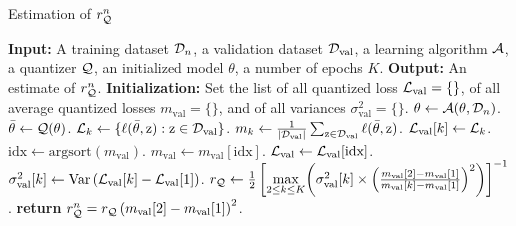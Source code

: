 
\begin{algorithm}
    \caption{Estimation of $r_{{\mathcal{Q}}}^n$}
    \label{algo:main}
    \begin{algorithmic}[1]
        \STATE \textbf{Input:} A training dataset ${\mathcal{D}}_n$, a validation dataset ${\mathcal{D}}_{\textrm{val}}$, a learning algorithm ${\mathcal{A}}$, a quantizer ${\mathcal{Q}}$, an initialized model $\theta$, a number of epochs $K$.
        \STATE \textbf{Output:} An estimate of $r_{{\mathcal{Q}}}^n$.
        \STATE \textbf{Initialization:} Set the list of all quantized loss $\mathcal{L}_{\textrm{val}} = \{\}$, of all average quantized losses $m_{\textrm{val}} = \{\}$, and of all variances $\sigma_{\textrm{val}}^2 = \{\}$.
            \STATE $\theta \leftarrow {\mathcal{A}}(\theta, {\mathcal{D}}_n)$.
            \STATE ${\Bar{\theta}} \leftarrow {\mathcal{Q}}(\theta)$.
            \STATE $\mathcal{L}_k \leftarrow \{\ell({\Bar{\theta}}, {\textnormal{z}}) : {\textnormal{z}}\in{\mathcal{D}}_{\textrm{val}}\}$.
            \STATE $m_k \leftarrow \frac{1}{|{\mathcal{D}}_{\textrm{val}}|}\sum_{{\textnormal{z}}\in{\mathcal{D}}_{\textrm{val}}}\ell({\Bar{\theta}}, {\textnormal{z}})$.
            \STATE $\mathcal{L}_{\text{val}}[k] \leftarrow \mathcal{L}_k$.
        \ENDFOR
        \STATE $\text{idx} \leftarrow \text{argsort}(m_{\text{val}})$.
        \STATE $m_{\textrm{val}} \leftarrow m_{\textrm{val}}[\text{idx}]$.
        \STATE $\mathcal{L}_{\textrm{val}} \leftarrow \mathcal{L}_{\textrm{val}}[\text{idx}]$.
            \STATE $\sigma_{\textrm{val}}^2[k] \leftarrow \textrm{Var}\left(\mathcal{L}_{\text{val}}[k] - \mathcal{L}_{\text{val}}[1]\right)$.
        \ENDFOR
        \STATE $r_{{\mathcal{Q}}} \leftarrow \frac{1}{2}\left[\underset{2\leq k\leq K}\max{\left(\sigma_{\text{val}}^2[k] \times \left(\frac{m_{\text{val}}[2] - m_{\text{val}}[1]}{m_{\text{val}}[k] - m_{\text{val}}[1]}\right)^2\right)}\right]^{-1}$.
        \STATE \textbf{return} $r_{{\mathcal{Q}}}^n = r_{{\mathcal{Q}}} \left(m_{\text{val}}[2] - m_{\text{val}}[1]\right)^2$.

    \end{algorithmic}
\end{algorithm}


